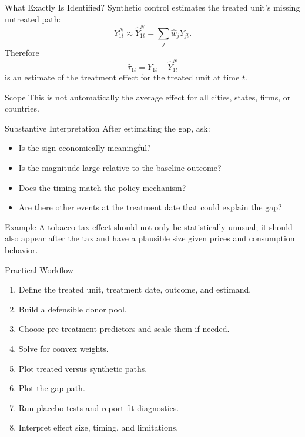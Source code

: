 \documentclass[11pt,aspectratio=169]{beamer}
\newcommand{\derivbutton}[1]{\vspace{0.4em}\hfill\hyperlink{app:#1}{\beamerbutton{Appendix details}}}
\begin{document}
\begin{frame}{What Exactly Is Identified?}
  Synthetic control estimates the treated unit's missing untreated path:
  \[
    Y^N_{1t}
    \approx
    \widehat{Y}^N_{1t}
    =
    \sum_j\widehat{w}_jY_{jt}.
  \]
  Therefore
  \[
    \widehat{\tau}_{1t}=Y_{1t}-\widehat{Y}^N_{1t}
  \]
  is an estimate of the treatment effect for the treated unit at time \(t\).
  \begin{block}{Scope}
    This is not automatically the average effect for all cities, states, firms, or countries.
  \end{block}
\end{frame}

\begin{frame}{Substantive Interpretation}
  After estimating the gap, ask:
  \begin{itemize}
    \item Is the sign economically meaningful?
    \item Is the magnitude large relative to the baseline outcome?
    \item Does the timing match the policy mechanism?
    \item Are there other events at the treatment date that could explain the gap?
  \end{itemize}
  \begin{block}{Example}
    A tobacco-tax effect should not only be statistically unusual; it should also appear after the tax and have a plausible size given prices and consumption behavior.
  \end{block}
\end{frame}

\begin{frame}{Practical Workflow}
  \hypertarget{main:workflow}{}
  \begin{enumerate}
    \item Define the treated unit, treatment date, outcome, and estimand.
    \item Build a defensible donor pool.
    \item Choose pre-treatment predictors and scale them if needed.
    \item Solve for convex weights.
    \item Plot treated versus synthetic paths.
    \item Plot the gap path.
    \item Run placebo tests and report fit diagnostics.
    \item Interpret effect size, timing, and limitations.
  \end{enumerate}
  \derivbutton{workflow-checklist}
\end{frame}
\end{document}
